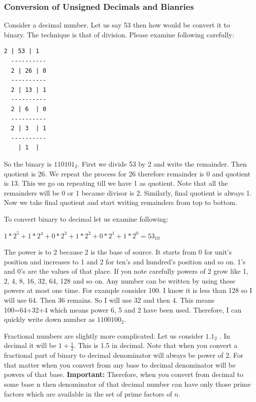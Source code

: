 \subsubsection{Conversion of Unsigned Decimals and Bianries}
Consider a decimal number. Let us say 53 then how would be convert it to
binary. The technique is that of division. Please examine following carefully:

\hspace*{2cm}
\begin{Verbatim}[frame=single]
  2 | 53 | 1
  ----------
  2 | 26 | 0
  ----------
  2 | 13 | 1
  ----------
  2 | 6  | 0
  ----------
  2 | 3  | 1
  ----------
    | 1  |
\end{Verbatim}

So the binary is $110101_2$. First we divide 53 by 2 and write the
remainder. Then quotient is 26. We repeat the process for 26 therefore
remainder is 0 and quotient is 13. This we go on repeating till we have 1 as
quotient. Note that all the remainders will be 0 or 1 because divisor is
2. Similarly, final quotient is always 1. Now we take final quotient and start
writing remainders from top to bottom.

To convert binary to decimal let us examine following:

$1*2^5 +1*2^4 +0*2^3 +1*2^2 +0*2^1 +1*2^0 =53_{10}$

The power is to 2 because 2 is the base of source. It starts from 0 for unit's
position and increases to 1 and 2 for ten's and hundred's position and so
on. 1's and 0's are the values of that place. If you note carefully powers of 2
grow like 1, 2, 4, 8, 16, 32, 64, 128 and so on. Any number can be written by
using these powers at most one time. For example consider 100. I know it is
less than 128 so I will use 64. Then 36 remains. So I will use 32 and then
4. This means 100=64+32+4  which means power 6, 5 and 2 have been
used. Therefore, I can quickly write down number as $1100100_2$.

\label{fractional binary numbers}
Fractional numbers are slightly more complicated. Let us consider $1.1_2$  . In
decimal it will be $1+\frac{1}{2}$. This is 1.5 in decimal. Note that when you
convert a fractional part of binary to decimal denominator will always be power
of 2. For that matter when you convert from any base to decimal denominator
will be powers of that base. \textbf{Important:} Therefore, when you convert
from decimal to some base n then denominator of that decimal number can have
only those prime factors which are available in the set of prime factors of
$n$.

